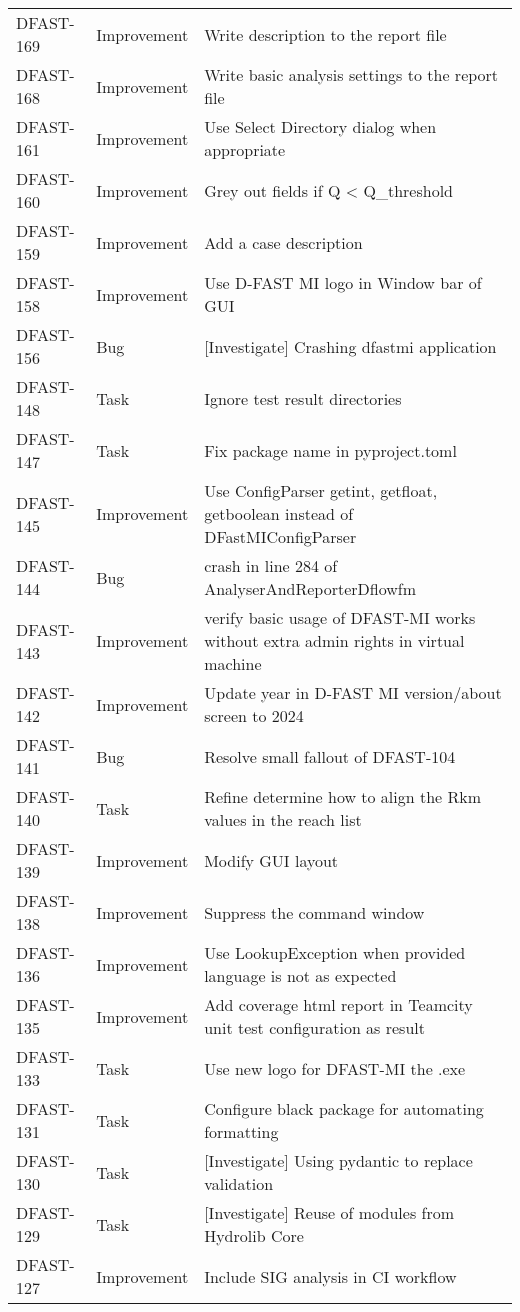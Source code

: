 \documentclass[git]{deltares_manual}
\begin{document}
\begin{longtable}{l|l|p{8cm}}
DFAST-169 & Improvement & Write description to the report file \\
DFAST-168 & Improvement & Write basic analysis settings to the report file \\
DFAST-161 & Improvement & Use Select Directory dialog when appropriate \\
DFAST-160 & Improvement & Grey out fields if Q < Q\_threshold \\
DFAST-159 & Improvement & Add a case description \\
DFAST-158 & Improvement & Use D-FAST MI logo in Window bar of GUI \\
DFAST-156 & Bug & [Investigate] Crashing dfastmi application \\
DFAST-148 & Task & Ignore test result directories \\
DFAST-147 & Task & Fix package name in pyproject.toml \\
DFAST-145 & Improvement & Use ConfigParser getint, getfloat, getboolean instead of DFastMIConfigParser \\
DFAST-144 & Bug & crash in line 284 of AnalyserAndReporterDflowfm \\
DFAST-143 & Improvement & verify basic usage of DFAST-MI works without extra admin rights in virtual machine \\
DFAST-142 & Improvement & Update year in D-FAST MI version/about screen to 2024 \\
DFAST-141 & Bug & Resolve small fallout of DFAST-104 \\
DFAST-140 & Task & Refine determine how to align the Rkm values in the reach list \\
DFAST-139 & Improvement & Modify GUI layout \\
DFAST-138 & Improvement & Suppress the command window \\
DFAST-136 & Improvement & Use LookupException when provided language is not as expected \\
DFAST-135 & Improvement & Add coverage html report in Teamcity unit test configuration as result \\
DFAST-133 & Task & Use new logo for DFAST-MI the .exe \\
DFAST-131 & Task & Configure black package for automating formatting \\
DFAST-130 & Task & [Investigate] Using pydantic to replace validation \\
DFAST-129 & Task & [Investigate] Reuse of modules from Hydrolib Core \\
DFAST-127 & Improvement & Include SIG analysis in CI workflow \\

\end{longtable}
\end{document}
